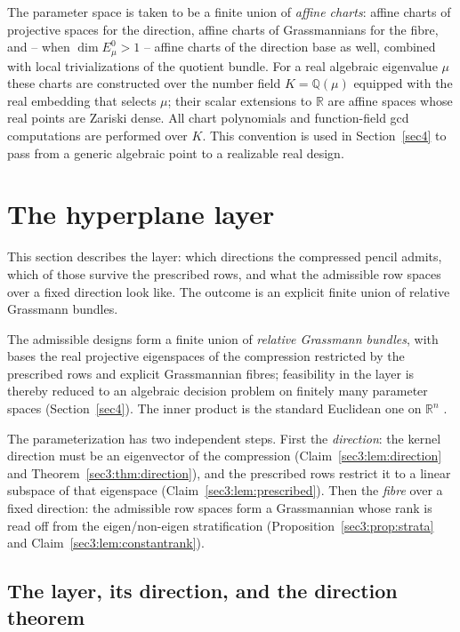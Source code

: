 \documentclass[journal]{IEEEtran}
\theoremstyle{plainn}
\theoremstyle{remark}
\begin{document}
The parameter space is taken to be a finite union of \emph{affine charts}: affine charts of projective
spaces for the direction, affine charts of Grassmannians for the fibre, and -- when
$\dim E_\mu^0>1$ -- affine charts of the direction base as well, combined with local trivializations of
the quotient bundle. For a real algebraic eigenvalue $\mu$ these charts are constructed over the number
field $K=\mathbb Q(\mu)$ equipped with the real embedding that selects $\mu$; their scalar extensions to
$\mathbb R$ are affine spaces whose real points are Zariski dense. All chart polynomials and
function-field gcd computations are performed over $K$. This convention is used in
Section~\ref{sec4} to pass from a generic algebraic point to a realizable real design.


\section{The hyperplane layer}\label{sec3}

This section describes the layer: which directions the compressed pencil admits, which of those
survive the prescribed rows, and what the admissible row spaces over a fixed direction look like. The
outcome is an explicit finite union of relative Grassmann bundles.

The admissible designs form a finite union of \emph{relative Grassmann bundles}, with bases the real
projective eigenspaces of the compression restricted by the prescribed rows and explicit Grassmannian
fibres; feasibility in the layer is thereby reduced to an algebraic decision problem on finitely many
parameter spaces (Section~\ref{sec4}). The inner product is the standard Euclidean one on
$\mathbb{R}^n$ \cite{hj13}.

The parameterization has two independent steps. First the \emph{direction}: the kernel direction must
be an eigenvector of the compression (Claim~\ref{sec3:lem:direction} and
Theorem~\ref{sec3:thm:direction}), and the prescribed rows restrict it to a linear subspace of that
eigenspace (Claim~\ref{sec3:lem:prescribed}). Then the \emph{fibre} over a fixed direction: the
admissible row spaces form a Grassmannian whose rank is read off from the eigen/non-eigen
stratification (Proposition~\ref{sec3:prop:strata} and Claim~\ref{sec3:lem:constantrank}).


\subsection{The layer, its direction, and the direction theorem}\label{sec3:sub:struct}\label{sec3:sub:direction}
\end{document}
